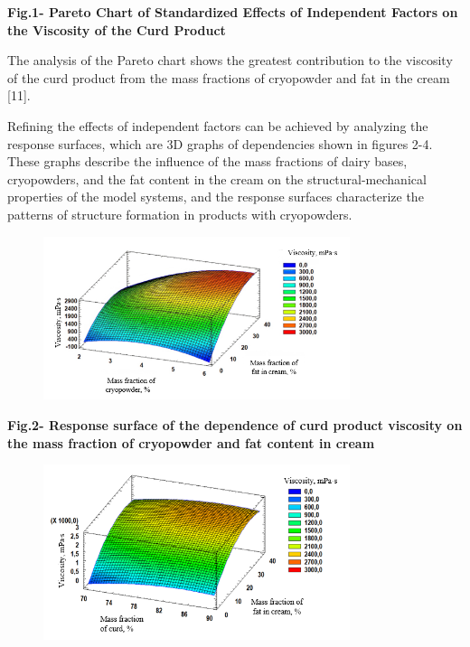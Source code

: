 {\bfseries Fig.1- Pareto Chart of Standardized Effects of Independent
Factors on the Viscosity of the Curd Product}

The analysis of the Pareto chart shows the greatest contribution to the
viscosity of the curd product from the mass fractions of cryopowder and
fat in the cream {[}11{]}.

Refining the effects of independent factors can be achieved by analyzing
the response surfaces, which are 3D graphs of dependencies shown in
figures 2-4. These graphs describe the influence of the mass fractions
of dairy bases, cryopowders, and the fat content in the cream on the
structural-mechanical properties of the model systems, and the response
surfaces characterize the patterns of structure formation in products
with cryopowders.


\begin{figure}[H]
	\centering
	\includegraphics[width=0.8\textwidth]{media/pish2/image82}
	\caption*{}
\end{figure}


{\bfseries Fig.2- Response surface of the dependence of curd product
viscosity on the mass fraction of cryopowder and fat content in cream}


\begin{figure}[H]
	\centering
	\includegraphics[width=0.8\textwidth]{media/pish2/image83}
	\caption*{}
\end{figure}


